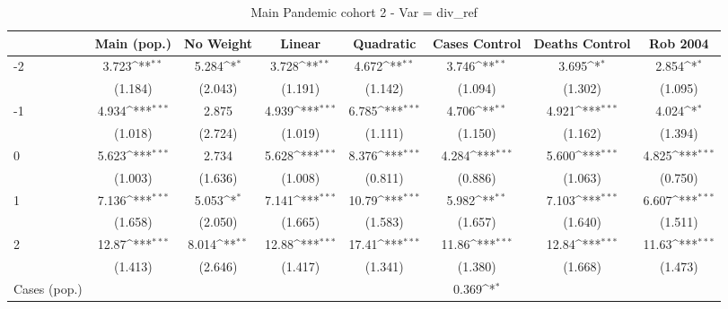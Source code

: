 \documentclass{article}
\begin{document}
{
\def\sym#1{\ifmmode^{#1}\else\(^{#1}\)\fi}
\begin{longtable}{l*{7}{c}}
\caption{Main Pandemic cohort 2 - Var = div\_ref}\\
\hline\hline\endfirsthead\hline\endhead\hline\endfoot\endlastfoot
                &\multicolumn{1}{c}{Main (pop.)}&\multicolumn{1}{c}{No Weight}&\multicolumn{1}{c}{Linear}&\multicolumn{1}{c}{Quadratic}&\multicolumn{1}{c}{Cases Control}&\multicolumn{1}{c}{Deaths Control}&\multicolumn{1}{c}{Rob 2004}\\
\hline
-2              &    3.723\sym{**} &    5.284\sym{*}  &    3.728\sym{**} &    4.672\sym{**} &    3.746\sym{**} &    3.695\sym{*}  &    2.854\sym{*}  \\
                &  (1.184)         &  (2.043)         &  (1.191)         &  (1.142)         &  (1.094)         &  (1.302)         &  (1.095)         \\
-1              &    4.934\sym{***}&    2.875         &    4.939\sym{***}&    6.785\sym{***}&    4.706\sym{**} &    4.921\sym{***}&    4.024\sym{*}  \\
                &  (1.018)         &  (2.724)         &  (1.019)         &  (1.111)         &  (1.150)         &  (1.162)         &  (1.394)         \\
0               &    5.623\sym{***}&    2.734         &    5.628\sym{***}&    8.376\sym{***}&    4.284\sym{***}&    5.600\sym{***}&    4.825\sym{***}\\
                &  (1.003)         &  (1.636)         &  (1.008)         &  (0.811)         &  (0.886)         &  (1.063)         &  (0.750)         \\
1               &    7.136\sym{***}&    5.053\sym{*}  &    7.141\sym{***}&    10.79\sym{***}&    5.982\sym{**} &    7.103\sym{***}&    6.607\sym{***}\\
                &  (1.658)         &  (2.050)         &  (1.665)         &  (1.583)         &  (1.657)         &  (1.640)         &  (1.511)         \\
2               &    12.87\sym{***}&    8.014\sym{**} &    12.88\sym{***}&    17.41\sym{***}&    11.86\sym{***}&    12.84\sym{***}&    11.63\sym{***}\\
                &  (1.413)         &  (2.646)         &  (1.417)         &  (1.341)         &  (1.380)         &  (1.668)         &  (1.473)         \\
Cases (pop.)    &                  &                  &                  &                  &    0.369\sym{*}  &                  &                  \\

\end{longtable}}
\end{document}
